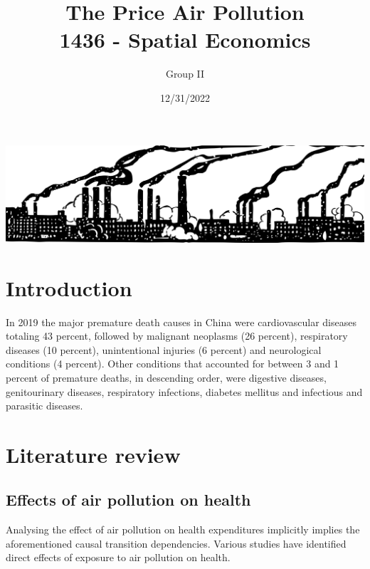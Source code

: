 \documentclass[
]{article}
\title{The Price Air Pollution\\
1436 - Spatial Economics}
\author{Group II}
\date{12/31/2022}
\begin{document}
\maketitle

\begin{center}
\includegraphics[width = 380pt]{pollution.png} 
\end{center}
\thispagestyle{empty}
\newpage
{}

\hypertarget{introduction}{%
\section{Introduction}\label{introduction}}

In 2019 the major premature death causes in China were cardiovascular diseases totaling 43 percent, followed by malignant neoplasms (26 percent), respiratory diseases (10 percent), unintentional injuries (6 percent) and neurological conditions (4 percent). Other conditions that accounted for between 3 and 1 percent of premature deaths, in descending order, were digestive diseases, genitourinary diseases, respiratory infections, diabetes mellitus and infectious and parasitic diseases. %

\hypertarget{literature review}{%
\section{Literature review}\label{Literature review}}

\subsection{Effects of air pollution on health}

Analysing the effect of air pollution on health expenditures implicitly implies the aforementioned causal transition dependencies. Various studies have identified direct effects of exposure to air pollution on health. %
\end{document}
